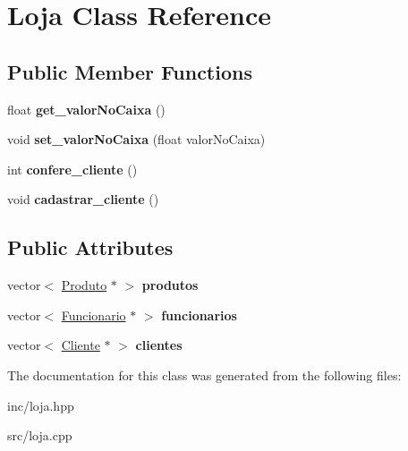 \hypertarget{class_loja}{}\section{Loja Class Reference}
\label{class_loja}
\subsection*{Public Member Functions}
\begin{DoxyCompactItemize}
\item 
\mbox{\label{class_loja_a582a978b13027e705591df3d09a249b5}} 
float {\bfseries get\+\_\+valor\+No\+Caixa} ()
\item 
\mbox{\label{class_loja_a04aff61cda0d26d86f861ea7956bbe44}} 
void {\bfseries set\+\_\+valor\+No\+Caixa} (float valor\+No\+Caixa)
\item 
\mbox{\label{class_loja_a3342cbf978535dfcdf55d7d604a81424}} 
int {\bfseries confere\+\_\+cliente} ()
\item 
\mbox{\label{class_loja_a7399ec3872379f90cbb6a03e7cd6260f}} 
void {\bfseries cadastrar\+\_\+cliente} ()
\end{DoxyCompactItemize}
\subsection*{Public Attributes}
\begin{DoxyCompactItemize}
\item 
\mbox{\label{class_loja_afdb6d9e9e5001e5eaaf038cc615a3f52}} 
vector$<$ \hyperlink{class_produto}{Produto} $\ast$ $>$ {\bfseries produtos}
\item 
\mbox{\label{class_loja_a24079d9b6184e1b4b7ff127910a78fb7}} 
vector$<$ \hyperlink{class_funcionario}{Funcionario} $\ast$ $>$ {\bfseries funcionarios}
\item 
\mbox{\label{class_loja_af8abae1471e8367bc9d7b58dbc1a2615}} 
vector$<$ \hyperlink{class_cliente}{Cliente} $\ast$ $>$ {\bfseries clientes}
\end{DoxyCompactItemize}


The documentation for this class was generated from the following files\+:\begin{DoxyCompactItemize}
\item 
inc/loja.\+hpp\item 
src/loja.\+cpp\end{DoxyCompactItemize}
